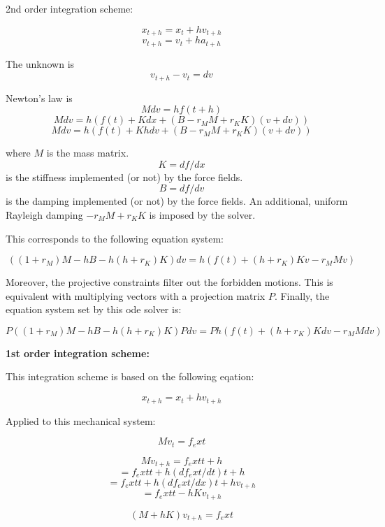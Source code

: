 \documentclass[9pt]{article}
\begin{document}
2nd order integration scheme:
 
    $$x_{t+h} = x_t + h v_{t+h}$$
    $$v_{t+h} = v_t + h a_{t+h}$$
 
    The unknown is
    $$v_{t+h} - v_t = dv$$
 
    Newton's law is
    $$ M dv = h f(t+h) $$
    $$ M dv = h ( f(t) + K dx     + (B - r_M M + r_K K) (v+dv) )$$
    $$ M dv = h ( f(t) + K h dv   + (B - r_M M + r_K K) (v+dv) )$$
 
    where $M$ is the mass matrix.
    $$ K = df/dx $$ is the stiffness implemented (or not) by the force fields.
    $$ B = df/dv $$ is the damping implemented (or not) by the force fields.
    An additional, uniform Rayleigh damping  $-r_M M + r_K K$ is imposed by the solver.
 
  This corresponds to the following equation system:
 
    $$ ( (1+r_M) M - h B - h(h + r_K) K ) dv = h ( f(t) + (h+r_K) K v - r_M M v )$$
 
  Moreover, the projective constraints filter out the forbidden motions.
  This is equivalent with multiplying vectors with a projection matrix $P$.
  Finally, the equation system set by this ode solver is:
 
    $$ P ( (1+r_M) M - h B - h(h + r_K) K ) P dv = P h ( f(t) + (h + r_K) K dv - r_M M dv )$$
 
{\bf 1st order integration scheme: }
 
  This integration scheme is based on the following eqation:
 
    $$x_{t+h} = x_t + h v_{t+h}$$
 
  Applied to this mechanical system:
 
    $$ M v_t = f_ext $$
 
    $$ M v_{t+h} = f_ext{t+h} $$
    $$           = f_ext{t} + h (df_ext/dt){t+h} $$
    $$           = f_ext{t} + h (df_ext/dx){t+h} v_{t+h} $$
    $$           = f_ext{t} - h K v_{t+h} $$
 
    $$ ( M + h K ) v_{t+h} = f_ext $$
 
 
\end{document}
